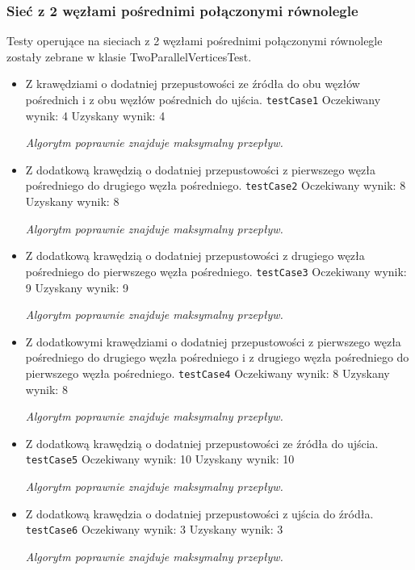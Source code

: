 \subsubsection{Sieć z 2 węzłami pośrednimi połączonymi równolegle}
Testy operujące na sieciach z 2 węzłami pośrednimi połączonymi równolegle zostały
zebrane w klasie TwoParallelVerticesTest.
\begin{itemize}[nosep]
    \item Z krawędziami o dodatniej przepustowości ze źródła do obu węzłów
    pośrednich i z obu węzłów pośrednich do ujścia.
    \texttt{testCase1}
    Oczekiwany wynik: 4
    Uzyskany wynik: 4

    \emph{Algorytm poprawnie znajduje maksymalny przepływ.}

    \item Z dodatkową krawędzią o dodatniej przepustowości z pierwszego węzła
    pośredniego do drugiego węzła pośredniego.
    \texttt{testCase2}
    Oczekiwany wynik: 8
    Uzyskany wynik: 8

    \emph{Algorytm poprawnie znajduje maksymalny przepływ.}

    \item Z dodatkową krawędzią o dodatniej przepustowości z drugiego węzła
    pośredniego do pierwszego węzła pośredniego.
    \texttt{testCase3}
    Oczekiwany wynik: 9
    Uzyskany wynik: 9

    \emph{Algorytm poprawnie znajduje maksymalny przepływ.}

    \item Z dodatkowymi krawędziami o dodatniej przepustowości z pierwszego
    węzła pośredniego do drugiego węzła pośredniego i z drugiego węzła
    pośredniego do pierwszego węzła pośredniego.
    \texttt{testCase4}
    Oczekiwany wynik: 8
    Uzyskany wynik: 8

    \emph{Algorytm poprawnie znajduje maksymalny przepływ.}

    \item Z dodatkową krawędzią o dodatniej przepustowości ze źródła do ujścia.
    \texttt{testCase5}
    Oczekiwany wynik: 10
    Uzyskany wynik: 10

    \emph{Algorytm poprawnie znajduje maksymalny przepływ.}

    \item Z dodatkową krawędzia o dodatniej przepustowości z ujścia do źródła.
    \texttt{testCase6}
    Oczekiwany wynik: 3
    Uzyskany wynik: 3

    \emph{Algorytm poprawnie znajduje maksymalny przepływ.}


\end{itemize}
